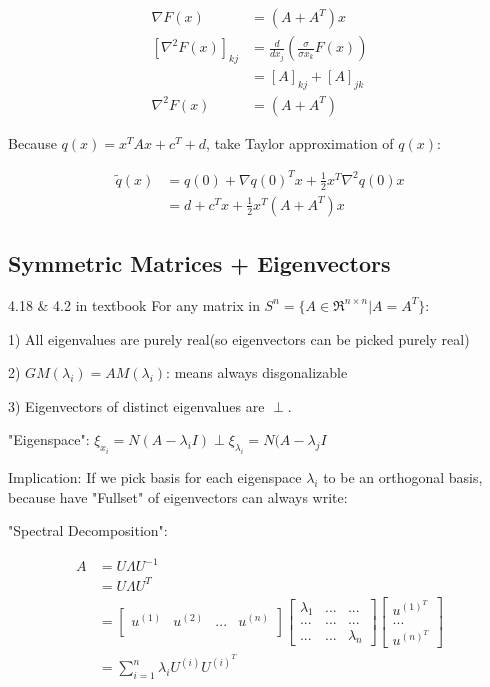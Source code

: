 \begin{align*}
\nabla F(x) &= (A + A^T)x\\
[\nabla^2F(x)]_{kj} &= \frac{d}{dx_j}(\frac{\sigma}{\sigma x_k}F(x))\\
&= [A]_{kj} + [A]_{jk}\\
\nabla^2F(x) &= (A + A^T)
\end{align*}

Because $q(x) = x^TAx + c^T + d$, take Taylor approximation of $q(x)$:

\begin{align*}
\tilde{q}(x) &= q(0) + \nabla q(0)^Tx + \frac{1}{2}x^T\nabla^2q(0)x\\
&= d + c^Tx + \frac{1}{2}x^T(A + A^T)x
\end{align*}

\subsection{Symmetric Matrices + Eigenvectors}

\begin{theorem}{4.18 \& 4.2 in textbook}
	For any matrix in $S^n = \{A\in \Re^{n\times n} | A = A^T \}$:
	
	1) All eigenvalues are purely real(so eigenvectors can be picked purely real)
	
	2) $GM(\lambda_i) = AM(\lambda_i)$: means always disgonalizable
	
	3) Eigenvectors of distinct eigenvalues are $\perp$.
	
	"Eigenspace": $\xi_{x_i} = N(A - \lambda_iI)\perp \xi_{\lambda_i} = N(A - \lambda_jI$
\end{theorem}

Implication: If we pick basis for each eigenspace $\lambda_i$ to be an orthogonal basis, because have "Fullset" of eigenvectors can always write:

"Spectral Decomposition":

\begin{align*}
A &= U\Lambda U^{-1}\\
&= U\Lambda U^{T}\\
&= 
\begin{bmatrix}%
u^{(1)} & u^{(2)} & ... & u^{(n)}\\
\end{bmatrix}
\begin{bmatrix}%
\lambda_1 & ... & ...\\
... & ... & ...\\
... & ... & \lambda_n
\end{bmatrix}
\begin{bmatrix}%
u^{(1)^T}\\
...\\
u^{(n)^T}
\end{bmatrix}\\
&= \sum^n_{i=1}\lambda_iU^{(i)}U^{(i)^T}
\end{align*}

